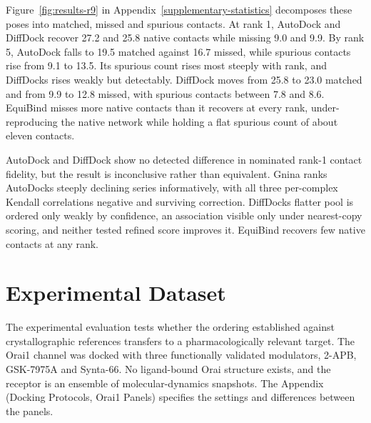 Figure~\ref{fig:results-r9} in Appendix~\ref{supplementary-statistics} decomposes these poses into matched, missed and spurious contacts. At rank 1, AutoDock and DiffDock recover 27.2 and 25.8 native contacts while missing 9.0 and 9.9. By rank 5, AutoDock falls to 19.5 matched against 16.7 missed, while spurious contacts rise from 9.1 to 13.5. Its spurious count rises most steeply with rank, and DiffDock\textquotesingle s rises weakly but detectably. DiffDock moves from 25.8 to 23.0 matched and from 9.9 to 12.8 missed, with spurious contacts between 7.8 and 8.6. EquiBind misses more native contacts than it recovers at every rank, under-reproducing the native network while holding a flat spurious count of about eleven contacts.

AutoDock and DiffDock show no detected difference in nominated rank-1 contact fidelity, but the result is inconclusive rather than equivalent. Gnina ranks AutoDock\textquotesingle s steeply declining series informatively, with all three per-complex Kendall correlations negative and surviving correction. DiffDock\textquotesingle s flatter pool is ordered only weakly by confidence, an association visible only under nearest-copy scoring, and neither tested refined score improves it. EquiBind recovers few native contacts at any rank.

\protect\hypertarget{_Toc235735934}{}{}

\hypertarget{experimental-dataset-1}{%
\section{Experimental Dataset}\label{experimental-dataset-1}}

The experimental evaluation tests whether the ordering established against crystallographic references transfers to a pharmacologically relevant target. The Orai1 channel was docked with three functionally validated modulators, 2-APB, GSK-7975A and Synta-66. No ligand-bound Orai structure exists, and the receptor is an ensemble of molecular-dynamics snapshots. The Appendix (Docking Protocols, Orai1 Panels) specifies the settings and differences between the panels.

